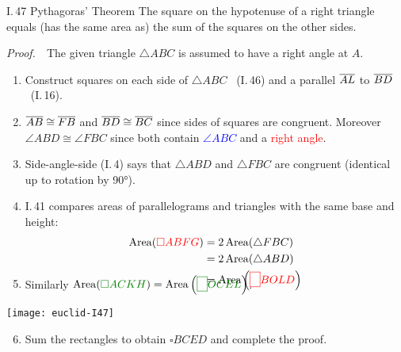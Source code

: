 \begin{thm}{I.\,47 Pythagoras' Theorem}{}
The square on the hypotenuse of a right triangle equals (has the same area as) the sum of the squares on the other sides.
\end{thm}

\begin{tcolorbox}[proofstyle]
\emph{Proof.}\ \ 
The given triangle $\triangle ABC$ is assumed to have a right angle at $A$.\par\vspace{-5pt}
\begin{minipage}[t]{0.6\linewidth}\vspace{0pt}
\begin{enumerate}\itemsep0pt
  \item Construct squares on each side of $\triangle ABC$ \ (I.\,46) and a parallel $\overline{AL}$ to $\overline{BD}$ \ (I.\,16).
  \item $\overline{AB}\cong\overline{FB}$ and $\overline{BD}\cong\overline{BC}$ since sides of squares are congruent. Moreover $\angle ABD\cong\angle FBC$ since both contain \textcolor{blue}{$\angle ABC$} and a \textcolor{red}{right angle}.
  \item Side-angle-side (I.\,4) says that $\triangle ABD$ and $\triangle FBC$ are congruent (identical up to rotation by \ang{90}).
	\item I.\,41 compares areas of parallelograms and triangles with the same base and height:\vspace{0pt}
	\begin{align*}
	\operatorname{Area}(\textcolor{red}{\square ABFG})&=2\operatorname{Area}(\triangle FBC)\\
	&=2\operatorname{Area}(\triangle ABD)\\
	&=\operatorname{Area}\left(\textcolor{red}{\fbox{\phantom{'}}BOLD}\right)\\[-25pt]
	\end{align*}
	\item Similarly $\operatorname{Area}(\textcolor{Green}{\square ACKH})=\operatorname{Area}\left(\textcolor{Green}{\fbox{\phantom{'}}OCEL}\right)$.
\end{enumerate}
\end{minipage}\hfill\begin{minipage}[t]{0.39\linewidth}\vspace{0pt}
\flushright\texttt{[image: euclid-I47]}
\end{minipage}
\begin{enumerate}\setcounter{enumi}{5}
	\item Sum the rectangles to obtain $\square BCED$ and complete the proof.\hfill\qedsymbol
\end{enumerate}
\end{tcolorbox}\goodbreak

